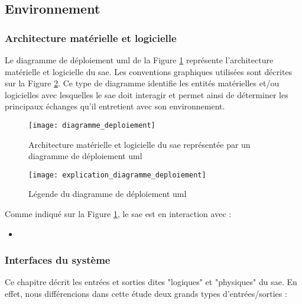 \subsection{Environnement} %

\subsubsection{Architecture matérielle et logicielle} %
\label{section:achitecture_materielle_logicielle}
Le diagramme de déploiement \gls{uml} de la Figure \ref{diagramme_deploiement} représente l’architecture matérielle et logicielle du \gls{sae}. Les conventions graphiques utilisées sont décrites sur la Figure \ref{explcation_diagramme_deploiement}. Ce type de diagramme identifie les entités matérielles et/ou logicielles avec lesquelles le \gls{sae} doit interagir et permet ainsi de déterminer les principaux échanges qu’il entretient avec son environnement.

\begin{figure}[H]
    \centering
    \texttt{[image: diagramme\_deploiement]}
    \caption{Architecture matérielle et logicielle du \gls{sae} représentée par un diagramme de déploiement \gls{uml}}
    \label{diagramme_deploiement}
\end{figure}

\begin{figure}[H]
    \centering
    \texttt{[image: explication\_diagramme\_deploiement]}
    \caption{Légende du diagramme de déploiement \gls{uml}}
    \label{explcation_diagramme_deploiement}
\end{figure}

Comme indiqué sur la Figure \ref{diagramme_deploiement}, le \gls{sae} est en interaction avec :
\begin{itemize}
    \item \complete
\end{itemize}

\subsubsection{Interfaces du système} \label{section:interface_du_systeme}%

Ce chapitre décrit les entrées et sorties dites "logiques" et "physiques" du \gls{sae}. En effet, nous différencions dans cette étude deux grands types d'entrées/sorties :

